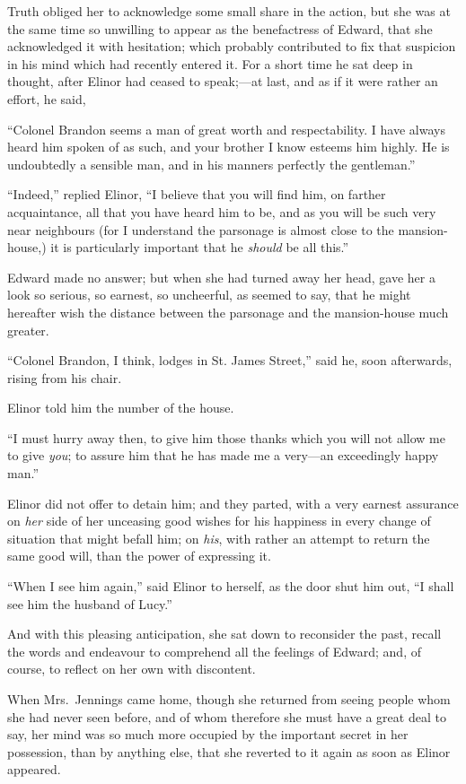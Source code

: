 \documentclass{article}
\begin{document}
Truth obliged her to acknowledge some small share
in the action, but she was at the same time so unwilling
to appear as the benefactress of Edward, that she acknowledged
it with hesitation; which probably contributed to fix
that suspicion in his mind which had recently entered it.
For a short time he sat deep in thought, after Elinor had ceased
to speak;---at last, and as if it were rather an effort, he said,

``Colonel Brandon seems a man of great worth and respectability.
I have always heard him spoken of as such, and your brother
I know esteems him highly.  He is undoubtedly a sensible man,
and in his manners perfectly the gentleman.''

``Indeed,'' replied Elinor, ``I believe that you will find him,
on farther acquaintance, all that you have heard him to be,
and as you will be such very near neighbours (for I understand
the parsonage is almost close to the mansion-house,)
it is particularly important that he \emph{should} be all this.''

Edward made no answer; but when she had turned
away her head, gave her a look so serious, so earnest,
so uncheerful, as seemed to say, that he might hereafter wish
the distance between the parsonage and the mansion-house
much greater.

``Colonel Brandon, I think, lodges in St. James Street,''
said he, soon afterwards, rising from his chair.

Elinor told him the number of the house.

``I must hurry away then, to give him those thanks
which you will not allow me to give \emph{you}; to assure him
that he has made me a very---an exceedingly happy man.''

Elinor did not offer to detain him; and they parted,
with a very earnest assurance on \emph{her} side of her unceasing
good wishes for his happiness in every change of situation
that might befall him; on \emph{his}, with rather an attempt to
return the same good will, than the power of expressing it.

``When I see him again,'' said Elinor to herself,
as the door shut him out, ``I shall see him the husband
of Lucy.''

And with this pleasing anticipation, she sat down
to reconsider the past, recall the words and endeavour
to comprehend all the feelings of Edward; and, of course,
to reflect on her own with discontent.

When Mrs.\ Jennings came home, though she returned
from seeing people whom she had never seen before,
and of whom therefore she must have a great deal to say,
her mind was so much more occupied by the important secret
in her possession, than by anything else, that she
reverted to it again as soon as Elinor appeared.
\end{document}
